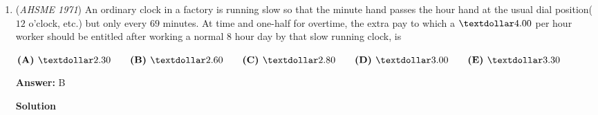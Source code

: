 \begin{enumerate}
 Then, plug in values of $S, S',$ and $n$ into each of the answer choices and see if it matches the product. 

 Answer choice $\boxed{\textbf{(B) }(S/S')^{\frac{1}{2}n}}$ works: $(\frac{15}{\frac{15}{8}})^2 = 64.$

 -edited by coolmath34

 



\textbf{Solution 3 (Answer Choices)}

We can use \href{https://artofproblemsolving.com/wiki/index.php?title=Dimensional\_analysis&action=edit&redlink=1}{dimensional analysis} to cut down our answer choices. Suppose that each of the terms in the geometric progression is in units of $\text{meters}$. Then, $S$ should have units of $\text{meters}$, $S^{\prime}$ units of $\frac1{\text{meters}}$ and $P$ units of $\text{meters}^n$. Therefore, $SS^{\prime}$ is unitless, so we can eliminate options (A) and (C). $S/S^{\prime}$ has units $\text{meters}^2$, so, to equal $P$ (which has units $\text{meters}^n$), the exponent needs to be $\frac n2$. The only remaining answer choice which satsifies this constraint is $\boxed{\textbf{(B) }(S/S^{\prime})^{\frac12n}}$.

 This problem is WRONG. A counterexample is given in the video:

 


	\item (\textit{AHSME 1971}) An ordinary clock in a factory is running slow so that the minute hand passes the hour hand at the usual dial position($12$ o'clock, etc.) 
but only every $69$ minutes. At time and one-half for overtime, the extra pay to which a $\textdollar 4.00$ per hour worker should be entitled 
after working a normal $8$ hour day by that slow running clock, is


 $\textbf{(A) }\textdollar 2.30\qquad \textbf{(B) }\textdollar 2.60\qquad \textbf{(C) }\textdollar 2.80\qquad \textbf{(D) }\textdollar 3.00\qquad \textbf{(E) }\textdollar 3.30$

 \textbf{Answer: }B



\textbf{Solution}


\end{enumerate}
